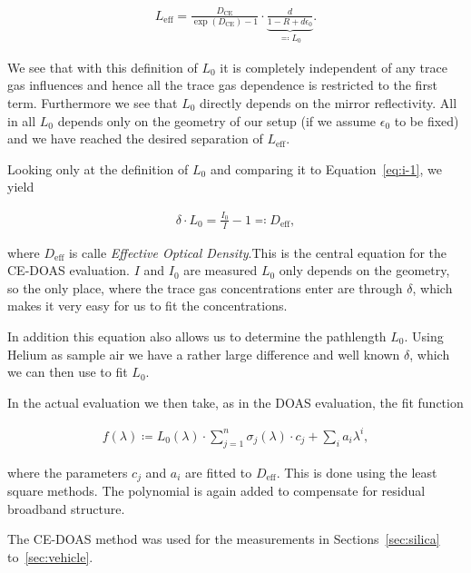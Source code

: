 \begin{align}
  L_{\text{eff}} = \frac{D_{\text{CE}}}{\exp(D_{\text{CE}}) - 1} \cdot
  \underbrace{\frac{d}{1 - R + d\epsilon_0}}_{\eqqcolon L_0}.
\end{align}

We see that with this definition of $L_0$ it is completely independent
of any trace gas influences and hence all the trace gas dependence is
restricted to the first term. Furthermore we see that $L_0$ directly
depends on the mirror reflectivity. All in all $L_0$ depends only on
the geometry of our setup (if we assume $\epsilon_0$ to be fixed) and
we have reached the desired separation of $L_{\text{eff}}$.

Looking only at the definition of $L_0$ and comparing it to
Equation~\eqref{eq:i-1}, we yield

\begin{align}
  \delta \cdot L_0 = \frac{I_0}{I} - 1 \eqqcolon D_{\text{eff}}, \label{eq:ce-central}
\end{align}

where $D_{\text{eff}}$ is calle \emph{Effective Optical Density}.This
is the central equation for the CE-DOAS evaluation. $I$ and $I_0$ are
measured $L_0$ only depends on the geometry, so the only place, where
the trace gas concentrations enter are through $\delta$, which makes
it very easy for us to fit the concentrations.

In addition this equation also allows us to determine the pathlength
$L_0$. Using Helium as sample air we have a rather large difference
and well known $\delta$, which we can then use to fit
$L_0$.

In the actual evaluation we then take, as in the DOAS evaluation, the fit function

\begin{align*}
  f(\lambda) \coloneqq L_0(\lambda)\cdot\sum_{j=1}^n \sigma_j(\lambda)
  \cdot c_j + \sum_i a_i \lambda^i,
\end{align*}

where the parameters $c_j$ and $a_i$ are fitted to
$D_{\text{eff}}$. This is done using the least square methods. The
polynomial is again added to compensate for residual broadband structure.

The CE-DOAS method was used for the measurements in
Sections~\ref{sec:silica} to~\ref{sec:vehicle}. 

